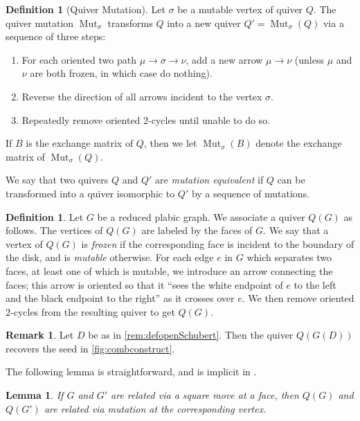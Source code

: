 \documentclass{amsart}
\newtheorem{lemma}[thm]{Lemma}
\theoremstyle{definition}
\newtheorem{definition}[thm]{Definition}
\newtheorem{remark}[thm]{Remark}
\numberwithin{equation}{section}
\newcommand{\Mut}{\operatorname{Mut}}
\begin{document}
\begin{definition}[Quiver Mutation]
Let $\sigma$ be a mutable vertex of quiver $Q$.  The quiver mutation 
$\Mut_\sigma$ transforms $Q$ into a new quiver $Q' = \Mut_\sigma(Q)$ via a sequence of three steps:
\begin{enumerate}
\item For each oriented two path $\mu \to \sigma \to \nu$, add a new arrow $\mu \to \nu$
(unless $\mu$ and $\nu$ are both frozen, in which case do nothing).
\item Reverse the direction of all arrows incident to the vertex $\sigma$.
\item Repeatedly remove oriented $2$-cycles until unable to do so.
\end{enumerate}
	If $B$ is the exchange matrix of $Q$, then we let $\Mut_{\sigma}(B)$ denote the 
	exchange matrix of $\Mut_{\sigma}(Q)$.

\end{definition}

We say that two quivers $Q$ and $Q'$ are \emph{mutation equivalent} if $Q$
can be transformed into a quiver isomorphic to $Q'$ by a sequence of mutations.



\begin{definition}
Let $G$ be a reduced plabic graph.  We associate a quiver $Q(G)$ as follows.  The vertices of 
$Q(G)$ are labeled by the faces of $G$.  We say that a vertex of $Q(G)$ is \emph{frozen}
if the 
corresponding face is incident to the boundary of the disk, and is \emph{mutable} otherwise.
For each edge $e$ in $G$ which separates two faces, at least one of which is mutable, 
we introduce an arrow connecting the faces;
 this arrow is oriented so that it ``sees the white endpoint of $e$ to the left and the 
black endpoint to the right'' as it crosses over $e$.  We then remove oriented $2$-cycles
from the resulting quiver to get $Q(G)$. 
\end{definition}

\begin{remark}
Let $D$ be as in  \cref{rem:defopenSchubert}.	Then the quiver $Q(G(D))$ recovers the seed in 
\cref{fig:combconstruct}.

\end{remark}


The following lemma is straightforward, and is implicit in \cite{Scott}.

\begin{lemma}\label{lem:mutG}
If $G$ and $G'$ are related via a square move at a face,
then $Q(G)$ and $Q(G')$ are related via mutation at the corresponding vertex.
\end{lemma}
\end{document}
